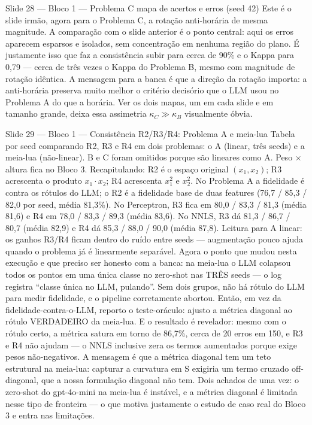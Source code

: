 \documentclass[aspectratio=169,10pt]{beamer}
\begin{document}
\begin{frame}{Slide 28 --- Bloco 1 --- Problema C mapa de acertos e erros (seed 42)}
\footnotesize
Este \'e o slide irm\~ao, agora para o Problema C, a rota\c{c}\~ao anti-hor\'aria de mesma magnitude. A compara\c{c}\~ao com o slide anterior \'e o ponto central: aqui os erros aparecem esparsos e isolados, sem concentra\c{c}\~ao em nenhuma regi\~ao do plano. \'E justamente isso que faz a consist\^encia subir para cerca de 90\% e o Kappa para 0,79 --- cerca de tr\^es vezes o Kappa do Problema B, mesmo com magnitude de rota\c{c}\~ao id\^entica. A mensagem para a banca \'e que a dire\c{c}\~ao da rota\c{c}\~ao importa: a anti-hor\'aria preserva muito melhor o crit\'erio decis\'orio que o LLM usou no Problema A do que a hor\'aria. Ver os dois mapas, um em cada slide e em tamanho grande, deixa essa assimetria $\kappa_C \gg \kappa_B$ visualmente \'obvia.
\end{frame}

\begin{frame}{Slide 29 --- Bloco 1 --- Consist\^encia R2/R3/R4: Problema A e meia-lua}
\footnotesize
Tabela por seed comparando R2, R3 e R4 em dois problemas: o A (linear, tr\^es seeds) e a meia-lua (n\~ao-linear). B e C foram omitidos porque s\~ao lineares como A. Peso $\times$ altura fica no Bloco 3. Recapitulando: R2 \'e o espa\c{c}o original $(x_1, x_2)$; R3 acrescenta o produto $x_1 \cdot x_2$; R4 acrescenta $x_1^2$ e $x_2^2$. No Problema A a fidelidade \'e contra os r\'otulos do LLM; o R2 \'e a fidelidade base de duas features (76{,}7 / 85{,}3 / 82{,}0 por seed, m\'edia 81{,}3\%). No Perceptron, R3 fica em 80{,}0 / 83{,}3 / 81{,}3 (m\'edia 81{,}6) e R4 em 78{,}0 / 83{,}3 / 89{,}3 (m\'edia 83{,}6). No NNLS, R3 d\'a 81{,}3 / 86{,}7 / 80{,}7 (m\'edia 82{,}9) e R4 d\'a 85{,}3 / 88{,}0 / 90{,}0 (m\'edia 87{,}8). Leitura para A linear: os ganhos R3/R4 ficam dentro do ru\'ido entre seeds --- augmenta\c{c}\~ao pouco ajuda quando o problema j\'a \'e linearmente separ\'avel. Agora o ponto que mudou nesta execu\c{c}\~ao e que preciso ser honesto com a banca: na meia-lua o LLM colapsou todos os pontos em uma \'unica classe no zero-shot nas TR\^ES seeds --- o log registra ``classe \'unica no LLM, pulando''. Sem dois grupos, n\~ao h\'a r\'otulo do LLM para medir fidelidade, e o pipeline corretamente abortou. Ent\~ao, em vez da fidelidade-contra-o-LLM, reporto o teste-or\'aculo: ajusto a m\'etrica diagonal ao r\'otulo VERDADEIRO da meia-lua. E o resultado \'e revelador: mesmo com o r\'otulo certo, a m\'etrica satura em torno de 86,7\%, cerca de 20 erros em 150, e R3 e R4 n\~ao ajudam --- o NNLS inclusive zera os termos aumentados porque exige pesos n\~ao-negativos. A mensagem \'e que a m\'etrica diagonal tem um teto estrutural na meia-lua: capturar a curvatura em S exigiria um termo cruzado off-diagonal, que a nossa formula\c{c}\~ao diagonal n\~ao tem. Dois achados de uma vez: o zero-shot do gpt-4o-mini na meia-lua \'e inst\'avel, e a m\'etrica diagonal \'e limitada nesse tipo de fronteira --- o que motiva justamente o estudo de caso real do Bloco 3 e entra nas limita\c{c}\~oes.
\end{frame}
\end{document}
